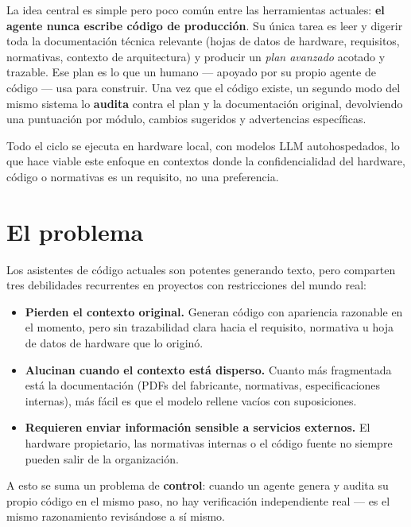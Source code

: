 \documentclass[11pt]{article}
\begin{document}
La idea central es simple pero poco común entre las herramientas actuales: \textbf{el agente nunca escribe código de producción}. Su única tarea es leer y digerir toda la documentación técnica relevante (hojas de datos de hardware, requisitos, normativas, contexto de arquitectura) y producir un \emph{plan avanzado} acotado y trazable. Ese plan es lo que un humano --- apoyado por su propio agente de código --- usa para construir. Una vez que el código existe, un segundo modo del mismo sistema lo \textbf{audita} contra el plan y la documentación original, devolviendo una puntuación por módulo, cambios sugeridos y advertencias específicas.

Todo el ciclo se ejecuta en hardware local, con modelos LLM autohospedados, lo que hace viable este enfoque en contextos donde la confidencialidad del hardware, código o normativas es un requisito, no una preferencia.

\section{El problema}

Los asistentes de código actuales son potentes generando texto, pero comparten tres debilidades recurrentes en proyectos con restricciones del mundo real:

\begin{itemize}
  \item \textbf{Pierden el contexto original.} Generan código con apariencia razonable en el momento, pero sin trazabilidad clara hacia el requisito, normativa u hoja de datos de hardware que lo originó.
  \item \textbf{Alucinan cuando el contexto está disperso.} Cuanto más fragmentada está la documentación (PDFs del fabricante, normativas, especificaciones internas), más fácil es que el modelo rellene vacíos con suposiciones.
  \item \textbf{Requieren enviar información sensible a servicios externos.} El hardware propietario, las normativas internas o el código fuente no siempre pueden salir de la organización.
\end{itemize}

A esto se suma un problema de \textbf{control}: cuando un agente genera y audita su propio código en el mismo paso, no hay verificación independiente real --- es el mismo razonamiento revisándose a sí mismo.

\end{document}
